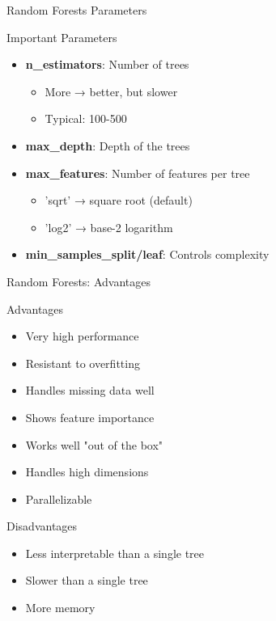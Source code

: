 \documentclass[aspectratio=169]{beamer}
\begin{document}
\begin{frame}{Random Forests Parameters}
\begin{block}{Important Parameters}
\begin{itemize}
    \item \textbf{n\_estimators}: Number of trees
    \begin{itemize}
        \item More → better, but slower
        \item Typical: 100-500
    \end{itemize}
    
    \item \textbf{max\_depth}: Depth of the trees
    
    \item \textbf{max\_features}: Number of features per tree
    \begin{itemize}
        \item 'sqrt' → square root (default)
        \item 'log2' → base-2 logarithm
    \end{itemize}
    
    \item \textbf{min\_samples\_split/leaf}: Controls complexity
\end{itemize}
\end{block}
\end{frame}

\begin{frame}{Random Forests: Advantages}
\begin{block}{Advantages}
\begin{itemize}
    \item Very high performance
    \item Resistant to overfitting
    \item Handles missing data well
    \item Shows feature importance
    \item Works well "out of the box"
    \item Handles high dimensions
    \item Parallelizable
\end{itemize}
\end{block}

\begin{alertblock}{Disadvantages}
\begin{itemize}
    \item Less interpretable than a single tree
    \item Slower than a single tree
    \item More memory
\end{itemize}
\end{alertblock}
\end{frame}
\end{document}
